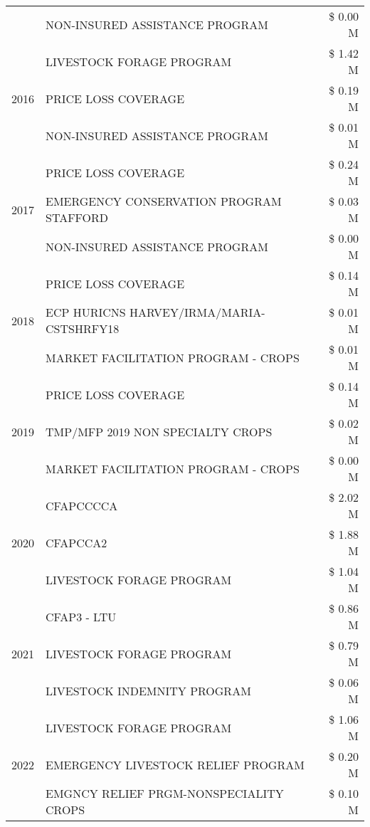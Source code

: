 \begin{tabular}{llr}
 & NON-INSURED ASSISTANCE PROGRAM & \$ 0.00 M \\
\cline{1-3}
\multirow[t]{3}{*}{2016} & LIVESTOCK FORAGE PROGRAM & \$ 1.42 M \\
 & PRICE LOSS COVERAGE & \$ 0.19 M \\
 & NON-INSURED ASSISTANCE PROGRAM & \$ 0.01 M \\
\cline{1-3}
\multirow[t]{3}{*}{2017} & PRICE LOSS COVERAGE & \$ 0.24 M \\
 & EMERGENCY CONSERVATION PROGRAM STAFFORD & \$ 0.03 M \\
 & NON-INSURED ASSISTANCE PROGRAM & \$ 0.00 M \\
\cline{1-3}
\multirow[t]{3}{*}{2018} & PRICE LOSS COVERAGE & \$ 0.14 M \\
 & ECP HURICNS HARVEY/IRMA/MARIA-CSTSHRFY18 & \$ 0.01 M \\
 & MARKET FACILITATION PROGRAM - CROPS & \$ 0.01 M \\
\cline{1-3}
\multirow[t]{3}{*}{2019} & PRICE LOSS COVERAGE & \$ 0.14 M \\
 & TMP/MFP 2019 NON SPECIALTY CROPS & \$ 0.02 M \\
 & MARKET FACILITATION PROGRAM - CROPS & \$ 0.00 M \\
\cline{1-3}
\multirow[t]{3}{*}{2020} & CFAPCCCCA & \$ 2.02 M \\
 & CFAPCCA2 & \$ 1.88 M \\
 & LIVESTOCK FORAGE PROGRAM & \$ 1.04 M \\
\cline{1-3}
\multirow[t]{3}{*}{2021} & CFAP3 - LTU & \$ 0.86 M \\
 & LIVESTOCK FORAGE PROGRAM & \$ 0.79 M \\
 & LIVESTOCK INDEMNITY PROGRAM & \$ 0.06 M \\
\cline{1-3}
\multirow[t]{3}{*}{2022} & LIVESTOCK FORAGE PROGRAM & \$ 1.06 M \\
 & EMERGENCY LIVESTOCK RELIEF PROGRAM & \$ 0.20 M \\
 & EMGNCY RELIEF PRGM-NONSPECIALITY CROPS & \$ 0.10 M \\
\cline{1-3}
\bottomrule
\end{tabular}
